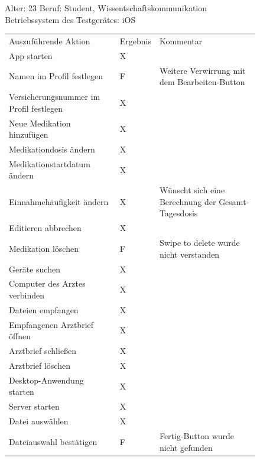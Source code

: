 \documentclass[a4paper]{scrreprt}
\begin{document}
 \begin{figure}
 
  Alter: 23 \newline
Beruf: Student, Wissentschaftskommunikation \newline
Betriebssystem des Testgerätes: iOS \newline \newline
 \begin{tabular}{ |l|l| p{6cm} }
  Auszuführende Aktion & Ergebnis & Kommentar \\
App starten & X & \\
Namen im Profil festlegen & F & Weitere Verwirrung mit dem Bearbeiten-Button \\
Versicherungsnummer im Profil festlegen & X & \\
Neue Medikation hinzufügen & X & \\
Medikationdosis ändern & X & \\
Medikationstartdatum ändern & X & \\
Einnahmehäufigkeit ändern & X & Wünscht sich eine Berechnung der Gesamt-Tagesdosis \\
Editieren abbrechen & X & \\
Medikation löschen & F & Swipe to delete wurde nicht verstanden\\
Geräte suchen & X & \\
Computer des Arztes verbinden & X & \\
Dateien empfangen & X & \\Empfangenen Arztbrief öffnen & X & \\Arztbrief schließen & X & \\Arztbrief löschen & X & \\Desktop-Anwendung starten & X & \\Server starten & X & \\Datei auswählen & X & \\
Dateiauswahl bestätigen & F & Fertig-Button wurde nicht gefunden \\
\end{tabular}
 \newline
 \newline
 \newline
 \end{figure}
\end{document}
